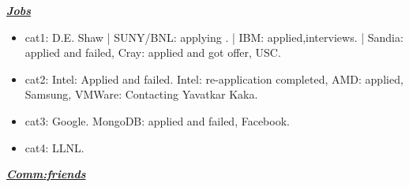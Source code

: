 \underline{\bf \it Jobs} 
    \begin{itemize}
      \tiny \item \tiny cat1: D.E. Shaw | SUNY/BNL: applying . | IBM:
      applied,interviews.  | Sandia: applied and failed, Cray: applied and got offer, USC. 
    \item \tiny cat2: Intel: Applied and failed. Intel: re-application  completed, AMD: applied, Samsung, VMWare: Contacting Yavatkar Kaka. 
    \item \tiny cat3: Google. MongoDB: applied and failed, Facebook. 
    \item \tiny cat4: LLNL. 
    \end{itemize} 


  \underline{\bf \it Comm:friends}
